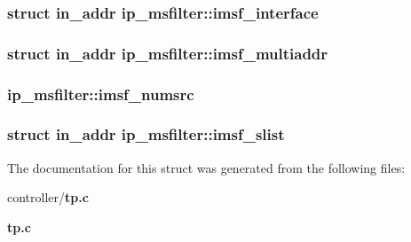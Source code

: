 \subsubsection[{imsf\_\-interface}]{\setlength{\rightskip}{0pt plus 5cm}struct {\bf in\_\-addr} {\bf ip\_\-msfilter::imsf\_\-interface}}\label{structip__msfilter_aff790bf91a1bb74ad9597becc83be866}
\subsubsection[{imsf\_\-multiaddr}]{\setlength{\rightskip}{0pt plus 5cm}struct {\bf in\_\-addr} {\bf ip\_\-msfilter::imsf\_\-multiaddr}}\label{structip__msfilter_a6fb4d21068741b8649afeb8fb275d2e4}
\subsubsection[{imsf\_\-numsrc}]{ {\bf ip\_\-msfilter::imsf\_\-numsrc}}\label{structip__msfilter_ab52390f2d1c8e320520595289facdc94}
\subsubsection[{imsf\_\-slist}]{\setlength{\rightskip}{0pt plus 5cm}struct {\bf in\_\-addr} {\bf ip\_\-msfilter::imsf\_\-slist}}\label{structip__msfilter_ae9de63e09096ba0fa4ecb78aa578906b}


The documentation for this struct was generated from the following files:\begin{DoxyCompactItemize}
\item 
controller/{\bf tp.c}\item 
{\bf tp.c}\end{DoxyCompactItemize}
